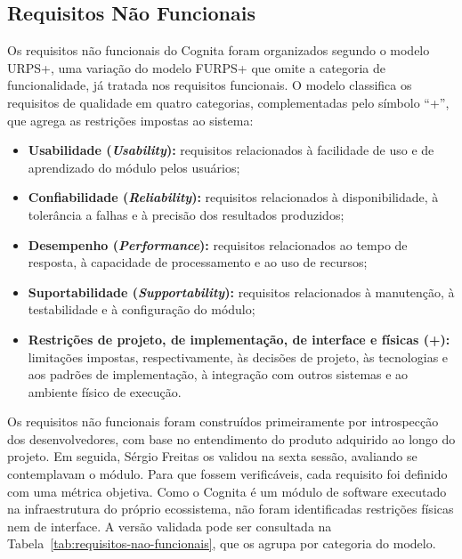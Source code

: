 \subsection{Requisitos Não Funcionais}
\label{subsec:requisitos-nao-funcionais}

Os requisitos não funcionais do Cognita foram organizados segundo o modelo URPS+, uma variação do modelo FURPS+ \cite{pressman_engenharia_2021} que omite a categoria de funcionalidade, já tratada nos requisitos funcionais. O modelo classifica os requisitos de qualidade em quatro categorias, complementadas pelo símbolo ``+'', que agrega as restrições impostas ao sistema:

\begin{itemize}
    \item \textbf{Usabilidade (\textit{Usability}):} requisitos relacionados à facilidade de uso e de aprendizado do módulo pelos usuários;
    \item \textbf{Confiabilidade (\textit{Reliability}):} requisitos relacionados à disponibilidade, à tolerância a falhas e à precisão dos resultados produzidos;
    \item \textbf{Desempenho (\textit{Performance}):} requisitos relacionados ao tempo de resposta, à capacidade de processamento e ao uso de recursos;
    \item \textbf{Suportabilidade (\textit{Supportability}):} requisitos relacionados à manutenção, à testabilidade e à configuração do módulo;
    \item \textbf{Restrições de projeto, de implementação, de interface e físicas (+):} limitações impostas, respectivamente, às decisões de projeto, às tecnologias e aos padrões de implementação, à integração com outros sistemas e ao ambiente físico de execução.
\end{itemize}

Os requisitos não funcionais foram construídos primeiramente por introspecção dos desenvolvedores, com base no entendimento do produto adquirido ao longo do projeto. Em seguida, Sérgio Freitas os validou na sexta sessão, avaliando se contemplavam o módulo. Para que fossem verificáveis, cada requisito foi definido com uma métrica objetiva. Como o Cognita é um módulo de software executado na infraestrutura do próprio ecossistema, não foram identificadas restrições físicas nem de interface. A versão validada pode ser consultada na Tabela~\ref{tab:requisitos-nao-funcionais}, que os agrupa por categoria do modelo.

